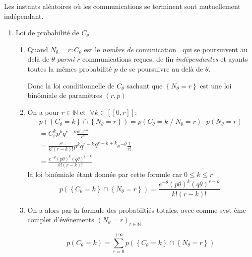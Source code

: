 \documentclass[a4paper, 11pt,reqno]{article}
\begin{document}
Les instants al\'{e}atoires o\`{u} les communications se terminent sont
mutuellement ind\'{e}pendant.

\begin{enumerate}
\item Loi de probabilit\'{e} de $C_{\theta }$

\begin{enumerate}
\item Quand $N_{\theta }=r:C_{\theta }$ est le \emph{nombre de }comunication%
\textbf{\ }qui se poursuivent au del\`{a} de $\theta $ \emph{parmi }$r$
communications re\c{c}ues, de fin \emph{ind\'{e}pendantes} et ayants toutes
la m\^{e}mes probabilit\'{e} $p$ de se poursuivre au del\`{a} de $\theta .$

Donc la loi conditionnelle de $C_{\theta }$ sachant que $\left\{ N_{\theta
}=r\right\} $ est une loi bin\^{o}miale de param\`{e}tres $\left( r,p\right) 
$

\item On a pour $r\in \mathbb{N\;}$et $\mathbb{\;\forall }k\in \left[ \left[
0,r\right] \right] :$ 
\begin{eqnarray*}
p\left( \left\{ C_{\theta }=k\right\} \cap \left\{ N_{\theta }=r\right\}
\right) =p\left( C_{\theta }=k\;/\;N_{\theta }=r\right) \cdot p\left(
N_{\theta }=r\right) \\
=C_{r}^{k}p^{k}q^{r-k}\frac{\theta ^{r}e^{-\theta }}{r!} \\
=\frac{r!}{k!\left( r-k\right) !}p^{k}q^{r-k}\theta ^{r-k+k}e^{-\theta }%
\frac{1}{r!} \\
=\displaystyle \frac{e^{-\theta }\left( p\theta \right) ^{k}\left( q\theta
\right) ^{r-k}}{k!\left( r-k\right) !}
\end{eqnarray*}
la loi bin\^{o}miale \'{e}tant donn\'{e}e par cette formule car $0\le k\le r$%
\begin{equation*}
\;\;p\left( \left\{ C_{\theta }=k\right\} \cap \left\{ N_{\theta }=r\right\}
\right) =\displaystyle \frac{e^{-\theta }\left( p\theta \right) ^{k}\left(
q\theta \right) ^{r-k}}{k!\left( r-k\right) !}\;\;\;
\end{equation*}

\item On a alors par la formule des probabilti\'{e}s totales, avec comme syst%
\`{e}me complet d'\'{e}v\'{e}nements $\left( N_{\theta }=r\right) _{r\in 
\mathbb{N}}$

\begin{equation*}
p\left( C_{\theta }=k\right) =\sum_{r=0}^{+\infty }p\left( \left\{ C_{\theta
}=k\right\} \cap \left\{ N_{\theta }=r\right\} \right)
\end{equation*}


\end{enumerate}
\end{enumerate}
\end{document}
